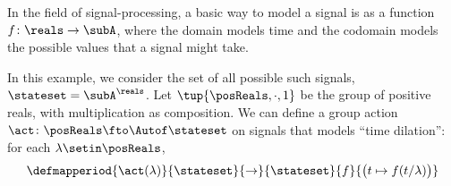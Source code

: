 





\begin{example}
In the field of signal-processing, a basic way to model a signal is as a function $f \colon \reals \to \subA$, where the domain models time and the codomain models the possible values that a signal might take. 

In this example, we consider the set of all possible such signals, $\stateset = \subA^\reals$. Let $\tup{\posReals, \cdot, 1}$ be the group of positive reals, with multiplication as composition. We can define a group action $\act \colon \posReals \fto \Autof\stateset$ on signals that models ``time dilation'': for each $\lambda \setin \posReals$,
\begin{equation}
\defmapperiod{\act(\lambda)}{\stateset}{\to}{\stateset}{f}{\bigl(t \mapsto f(t / \lambda)\bigr)}
\end{equation}
\end{example}

